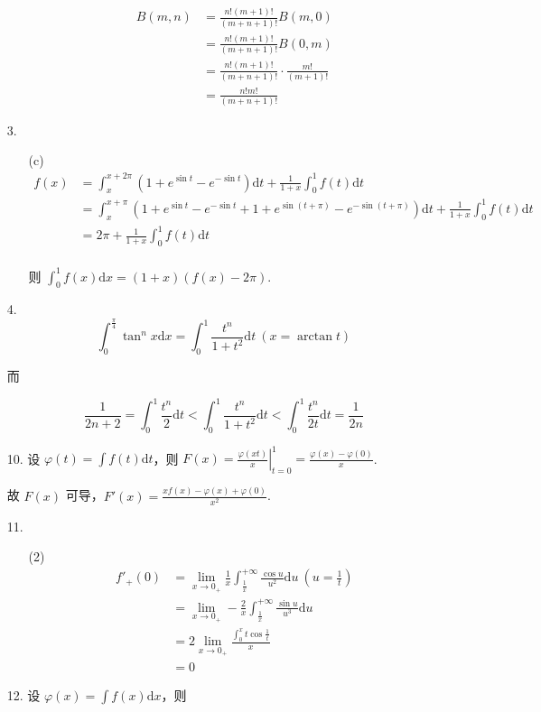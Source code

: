\documentclass[oneside]{ctexbook} %
\begin{document}
\begin{enumerate}
\begin{enumerate}
        $$
        \begin{aligned}
            B(m, n) &= \frac{n!(m+1)!}{(m+n+1)!} B(m, 0) \\
            &= \frac{n!(m+1)!}{(m+n+1)!} B(0, m) \\
            &= \frac{n!(m+1)!}{(m+n+1)!} \cdot \frac{m!}{(m+1)!} \\
            &= \frac{n!m!}{(m+n+1)!}
        \end{aligned}
        $$
    \end{enumerate}
    \item[3.]
    \begin{enumerate}
        \item[(c)]
        $$
        \begin{aligned}
            f(x) &= \int_x^{x+2\pi} (1 + e^{\sin t} - e^{-\sin t}) \mathrm dt + \frac 1 {1+x} \int_0^1 f(t) \mathrm dt \\
            &= \int_x^{x+\pi} \left( 1 + e^{\sin t} - e^{-\sin t} + 1 + e^{\sin(t+\pi)} - e^{-\sin(t+\pi)} \right) \mathrm dt + \frac 1 {1+x} \int_0^1 f(t) \mathrm dt \\
            &= 2\pi + \frac 1 {1+x} \int_0^1 f(t) \mathrm dt \\
        \end{aligned}
        $$
        
        则 $\displaystyle \int_0^1 f(x) \mathrm dx = (1 + x)(f(x) - 2\pi)$.
    \end{enumerate}
    \item[4.]
    $$
    \int_0^{\frac \pi 4} \tan^n x \mathrm dx = \int_0^1 \frac{t^n}{1+t^2} \mathrm dt \ (x = \arctan t)
    $$
    
    而
    
    $$
    \frac 1 {2n+2} = \int_0^1 \frac {t^n} 2 \mathrm dt < \int_0^1 \frac{t^n}{1+t^2} \mathrm dt < \int_0^1 \frac{t^n}{2t} \mathrm dt = \frac 1 {2n}
    $$
    \item[10.]
    设 $\displaystyle \varphi(t) = \int f(t) \mathrm dt$，则 $\displaystyle F(x) = \left. \frac {\varphi(xt)} x \right|_{t=0}^1 = \frac {\varphi(x) - \varphi(0)} x$.
    
    故 $F(x)$ 可导，$F'(x) = \frac{xf(x) - \varphi(x) + \varphi(0)}{x^2}$.
    \item[11.]
    \begin{enumerate}
        \item[(2)]
        $$
        \begin{aligned}
            f'_+(0) &= \lim_{x \to 0_+} \frac 1 x \int_{\frac 1 x}^{+\infty} \frac{\cos u}{u^2} \mathrm du \ (u = \frac 1 t) \\
            &= \lim_{x \to 0_+} - \frac 2 x \int_{\frac 1 x}^{+\infty} \frac{\sin u}{u^3} \mathrm du \\
            &= 2 \lim_{x \to 0_+} \frac{\int_0^x t \cos \frac 1 t}{x} \\
            &= 0
        \end{aligned}
        $$
    \end{enumerate}
    \item[12.]
    设 $\displaystyle \varphi(x) = \int f(x) \mathrm dx$，则
    

\end{enumerate}
\end{document}
